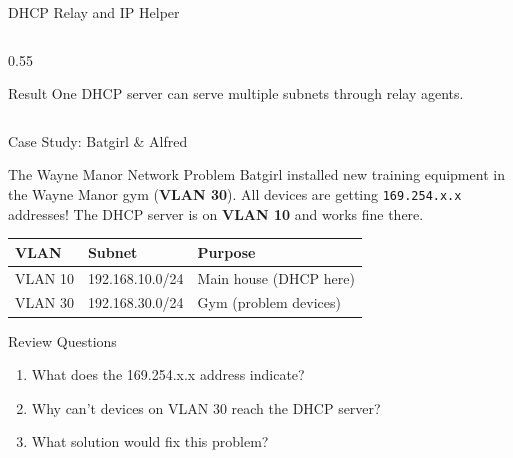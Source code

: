 \documentclass[aspectratio=169]{beamer}  %
\begin{document}
\begin{frame}{DHCP Relay and IP Helper}
\begin{columns}[T]
\begin{column}{0.55\textwidth}
            \vspace{0.2em}
            \begin{exampleblock}{Result}
                \small
                One DHCP server can serve multiple subnets through relay agents.
            \end{exampleblock}
        \end{column}
    \end{columns}
\end{frame}

\begin{frame}{Case Study: Batgirl \& Alfred}
    \begin{casestudy}{The Wayne Manor Network Problem}
        \small
        Batgirl installed new training equipment in the Wayne Manor gym (\textbf{VLAN 30}). All devices are getting \texttt{169.254.x.x} addresses! The DHCP server is on \textbf{VLAN 10} and works fine there.
        
        \vspace{0.2em}
        \footnotesize
        \begin{center}
            \begin{tabular}{l l l}
                \toprule
                \textbf{VLAN} & \textbf{Subnet} & \textbf{Purpose} \\
                \midrule
                VLAN 10 & 192.168.10.0/24 & Main house (DHCP here) \\
                VLAN 30 & 192.168.30.0/24 & Gym (problem devices) \\
                \bottomrule
            \end{tabular}
        \end{center}
    \end{casestudy}
    
    \begin{block}{Review Questions}
        \small
        \begin{enumerate}\setlength{\itemsep}{1pt}
            \item What does the 169.254.x.x address indicate?
            \item Why can't devices on VLAN 30 reach the DHCP server?
            \item What solution would fix this problem?
        \end{enumerate}
    \end{block}
\end{frame}
\end{document}

